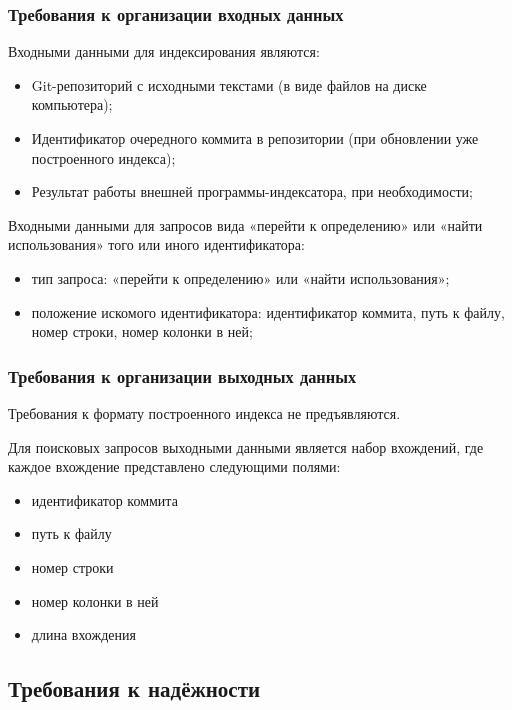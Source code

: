     \subsubsection{Требования к организации входных данных}
    	Входными данными для индексирования являются:
    	\begin{itemize}
    	    \item Git-репозиторий с исходными текстами (в виде файлов на диске компьютера);
    	    \item Идентификатор очередного коммита в репозитории (при обновлении уже построенного индекса);
    	    \item Результат работы внешней программы-индексатора, при необходимости;
    	\end{itemize}
    	
    	Входными данными для запросов вида «перейти к определению» или «найти использования» того или иного идентификатора:
    	\begin{itemize}
    	    \item тип запроса: «перейти к определению» или «найти использования»;
    	    \item положение искомого идентификатора: идентификатор коммита, путь к файлу, номер строки, номер колонки в ней;
    	\end{itemize}
    
    \subsubsection{Требования к организации выходных данных}
    	Требования к формату построенного индекса не предъявляются.
    	
    	Для поисковых запросов выходными данными является набор вхождений, где каждое вхождение представлено следующими полями:
    	\begin{itemize}
    	    \item идентификатор коммита
    	    \item путь к файлу
    	    \item номер строки
    	    \item номер колонки в ней
    	    \item длина вхождения
    	\end{itemize}

\subsection{Требования к надёжности}
\label{requirements.quality}
